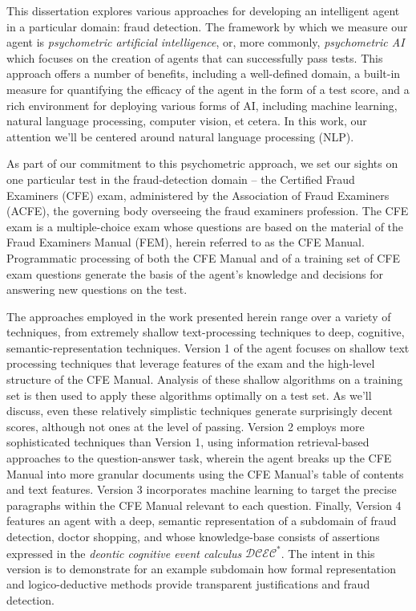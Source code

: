  
 
This dissertation explores various approaches for developing an intelligent agent in a particular domain: fraud detection.  The framework by which we measure our agent is \textit{psychometric artificial intelligence}, or, more commonly, \textit{psychometric AI} which focuses on the creation of agents that can successfully pass tests.  This approach offers a number of benefits, including a well-defined domain, a built-in measure for quantifying the efficacy of the agent in the form of a test score, and a rich environment for deploying various forms of AI, including machine learning, natural language processing, computer vision, et cetera.  In this work, our attention we'll be centered around natural language processing (NLP).

As part of our commitment to this psychometric approach, we set our sights on one particular test in the fraud-detection domain -- the Certified Fraud Examiners (CFE) exam, administered by the Association of Fraud Examiners (ACFE), the governing body overseeing the fraud examiners profession.  The CFE exam is a multiple-choice exam whose questions are based on the material of the Fraud Examiners Manual (FEM), herein referred to as the CFE Manual.  Programmatic processing of both the CFE Manual and of a training set of CFE exam questions generate the basis of the agent's knowledge and decisions for answering new questions on the test.

The approaches employed in the work presented herein range over a variety of techniques, from extremely shallow text-processing techniques to deep, cognitive, semantic-representation techniques.  Version 1 of the agent focuses on shallow text processing techniques that leverage features of the exam and the high-level structure of the CFE Manual.  Analysis of these shallow algorithms on a training set is then used to apply these algorithms optimally on a test set.  As we'll discuss, even these relatively simplistic techniques generate surprisingly decent scores, although not ones at the level of passing.  Version 2 employs more sophisticated techniques than Version 1, using information retrieval-based approaches to the question-answer task, wherein the agent breaks up the CFE Manual into more granular documents using the CFE Manual's table of contents and text features.  Version 3 incorporates machine learning to target the precise paragraphs within the CFE Manual relevant to each question.  Finally, Version 4 features an agent with a deep, semantic representation of a subdomain of fraud detection, doctor shopping, and whose knowledge-base consists of assertions expressed in the \textit{deontic cognitive event calculus} $\mathcal{DCEC}^\ast$.  The intent in this version is to demonstrate for an example subdomain how formal representation and logico-deductive methods provide transparent justifications and fraud detection. 

